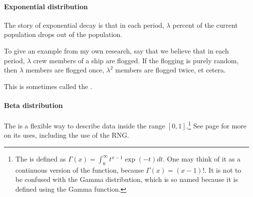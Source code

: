 \paragraph{Exponential distribution}

The story of exponential decay is that in each period, $\lambda$ percent
of the current population drops out of the population.

To give an example from my own research, say that we believe that in
each period, $\lambda$ crew members of a ship are flogged. If the flogging
is purely random, then $\lambda$ members are flogged once, $\lambda^2$
members are flogged twice, et cetera.

This is sometimes called the .







 
\paragraph{Beta distribution} The  is a flexible
way to describe data inside the range $[0, 1]$.\footnote{The  is defined as $\Gamma(x) = \int_0^\infty  t^{x-1} \exp(-t)
dt$. One may think of it as a continuous version of the 
function, because $\Gamma(x) = (x-1)!$. It is not to be confused with
the Gamma distribution, which is so named because it is defined using
the Gamma function.}
See page \pageref{beta} for more on its uses, including the use of the
 RNG.

